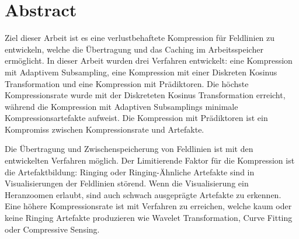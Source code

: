 \section*{Abstract}
Ziel dieser Arbeit ist es eine verlustbehaftete Kompression für Feldlinien zu entwickeln, welche die Übertragung und das Caching im Arbeitsspeicher ermöglicht. In dieser Arbeit wurden drei Verfahren entwickelt: eine Kompression mit Adaptivem Subsampling, eine Kompression mit einer Diskreten Kosinus Transformation und eine Kompression mit Prädiktoren. Die höchste Kompressionsrate wurde mit der Diskreteten Kosinus Transformation erreicht, während die Kompression mit Adaptiven Subsamplings minimale Kompressionsartefakte aufweist. Die Kompression mit Prädiktoren ist ein Kompromiss zwischen Kompressionsrate und Artefakte.

Die Übertragung und Zwischenspeicherung von Feldlinien ist mit den entwickelten Verfahren möglich. Der Limitierende Faktor für die Kompression ist die Artefaktbildung: Ringing oder Ringing-Ähnliche Artefakte sind in Visualisierungen der Feldlinien störend. Wenn die Visualisierung ein Heranzoomen erlaubt, sind auch schwach ausgeprägte Artefakte zu erkennen. Eine höhere Kompressionsrate ist mit Verfahren zu erreichen, welche kaum oder keine Ringing Artefakte produzieren wie Wavelet Transformation, Curve Fitting oder Compressive Sensing.